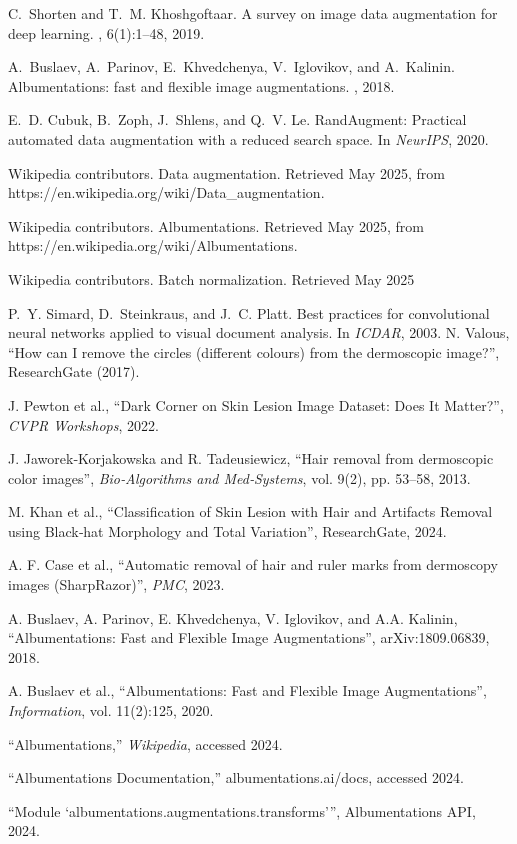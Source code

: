 \begin{thebibliography}{}
C.~Shorten and T.~M. Khoshgoftaar.
\newblock A survey on image data augmentation for deep learning.
, 6(1):1--48, 2019.

A.~Buslaev, A.~Parinov, E.~Khvedchenya, V.~Iglovikov, and A.~Kalinin.
\newblock Albumentations: fast and flexible image augmentations.
, 2018.

E.~D. Cubuk, B.~Zoph, J.~Shlens, and Q.~V. Le.
\newblock RandAugment: Practical automated data augmentation with a reduced
  search space.
\newblock In {\em NeurIPS}, 2020.

Wikipedia contributors.
\newblock Data augmentation.
\newblock Retrieved May 2025, from https://en.wikipedia.org/wiki/Data\_augmentation.

Wikipedia contributors.
\newblock Albumentations.
\newblock Retrieved May 2025, from https://en.wikipedia.org/wiki/Albumentations.

Wikipedia contributors.
\newblock Batch normalization.
\newblock Retrieved May 2025

P.~Y. Simard, D.~Steinkraus, and J.~C. Platt.
\newblock Best practices for convolutional neural networks applied to visual
  document analysis.
\newblock In {\em ICDAR}, 2003.
N. Valous, “How can I remove the circles (different colours) from the dermoscopic image?”, ResearchGate (2017).

J. Pewton et al., “Dark Corner on Skin Lesion Image Dataset: Does It Matter?”, \emph{CVPR Workshops}, 2022.

J. Jaworek‐Korjakowska and R. Tadeusiewicz, “Hair removal from dermoscopic color images”, \emph{Bio‐Algorithms and Med‐Systems}, vol. 9(2), pp. 53–58, 2013.

M. Khan et al., “Classification of Skin Lesion with Hair and Artifacts Removal using Black‐hat Morphology and Total Variation”, ResearchGate, 2024.

A. F. Case et al., “Automatic removal of hair and ruler marks from dermoscopy images (SharpRazor)”, \emph{PMC}, 2023.

A. Buslaev, A. Parinov, E. Khvedchenya, V. Iglovikov, and A.A. Kalinin, “Albumentations: Fast and Flexible Image Augmentations”, arXiv:1809.06839, 2018.

A. Buslaev et al., “Albumentations: Fast and Flexible Image Augmentations”, \emph{Information}, vol. 11(2):125, 2020.

“Albumentations,” \emph{Wikipedia}, accessed 2024.

“Albumentations Documentation,” albumentations.ai/docs, accessed 2024.

“Module `albumentations.augmentations.transforms’”, Albumentations API, 2024.

\end{thebibliography}
